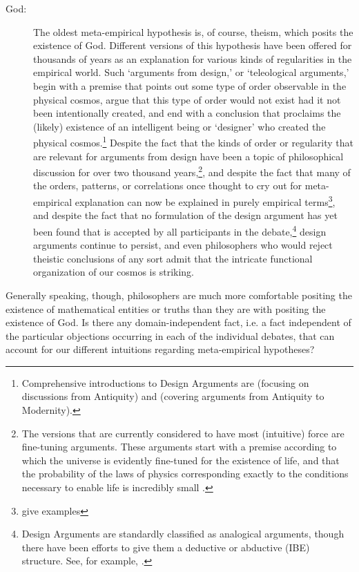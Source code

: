 \documentclass[a4paper,12pt]{article}
\begin{document}
\begin{description}
\item[God:] The oldest meta-empirical hypothesis is, of course, theism, which posits the existence of God. Different versions of this hypothesis have been offered for thousands of years as an explanation for various kinds of regularities in the empirical world. Such `arguments from design,' or `teleological arguments,' begin with a premise that points out some type of order observable in the physical cosmos, argue that this type of order would not exist had it not been intentionally created, and end with a conclusion that proclaims the (likely) existence of an intelligent being or `designer' who created the physical cosmos.\footnote{Comprehensive introductions to Design Arguments are \cite{Sedley2007} (focusing on discussions from Antiquity) and \cite{Jantzen2014} (covering arguments from Antiquity to Modernity).}
Despite the fact that the kinds of order or regularity that are relevant for arguments from design have been a topic of philosophical discussion for over two thousand years,\footnote{The versions that are currently considered to have most (intuitive) force are fine-tuning arguments. These arguments start with a premise according to which the universe is evidently fine-tuned for the existence of life, and that the probability of the laws of physics corresponding exactly to the conditions necessary to enable life is incredibly small \cite{x}.}, and despite the fact that many of the orders, patterns, or correlations once thought to cry out for meta-empirical explanation can now be explained in purely empirical terms\footnote{give examples}, and despite the fact that no formulation of the design argument has yet been found that is accepted by all participants in the debate,\footnote{Design Arguments are standardly classified as analogical arguments, though there have been efforts to give them a deductive or abductive (IBE) structure. See, for example, \cite{x}.} design arguments continue to persist, and even philosophers who would reject theistic conclusions of any sort admit that the intricate functional organization of our cosmos is striking.

\end{description}

Generally speaking, though, philosophers are much more comfortable positing the existence of mathematical entities or truths than they are with positing the existence of God. Is there any domain-independent fact, i.e. a fact independent of the particular objections occurring in each of the individual debates, that can account for our different intuitions regarding meta-empirical hypotheses?
\end{document}
